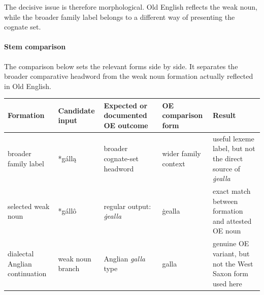\documentclass[
  british,
  a4paper,
]{article}
\newcounter{none} %
\begin{document}
The decisive issue is therefore morphological. Old English reflects the
weak noun, while the broader family label belongs to a different way of
presenting the cognate set.

\paragraph{Stem comparison}\label{stem-comparison}

The comparison below sets the relevant forms side by side. It separates
the broader comparative headword from the weak noun formation actually
reflected in Old English.

{\def\LTcaptype{none} %
\begin{longtable}[]{@{}
  >{\raggedright\arraybackslash}p{}
  >{\raggedright\arraybackslash}p{}
  >{\raggedright\arraybackslash}p{}
  >{\raggedright\arraybackslash}p{}
  >{\raggedright\arraybackslash}p{}@{}}
\toprule\noalign{}
\begin{minipage}[b]{\linewidth}\raggedright
Formation
\end{minipage} & \begin{minipage}[b]{\linewidth}\raggedright
Candidate input
\end{minipage} & \begin{minipage}[b]{\linewidth}\raggedright
Expected or documented OE outcome
\end{minipage} & \begin{minipage}[b]{\linewidth}\raggedright
OE comparison form
\end{minipage} & \begin{minipage}[b]{\linewidth}\raggedright
Result
\end{minipage} \\
\midrule\noalign{}
\endhead
\bottomrule\noalign{}
\endlastfoot
broader family label & *gállą & broader cognate-set headword & wider
family context & useful lexeme label, but not the direct source of
\emph{ġealla} \\
selected weak noun & *gállô & regular output: \emph{ġealla} & ġealla &
exact match between formation and attested OE noun \\
dialectal Anglian continuation & weak noun branch & Anglian \emph{galla}
type & galla & genuine OE variant, but not the West Saxon form used
here \\
\end{longtable}
}
\end{document}
